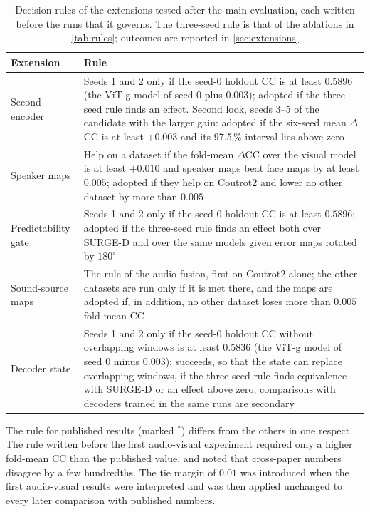 \begin{table}[htbp]
  \centering
  \caption{Decision rules of the extensions tested after the main evaluation,
  each written before the runs that it governs. The three-seed rule is that of
  the ablations in \cref{tab:rules}; outcomes are reported in
  \cref{sec:extensions}}\label{tab:rules-ext}
  \small
  \begin{tabularx}{\textwidth}{@{}>{\raggedright}p{3.3cm}>{\raggedright\arraybackslash}X@{}}
    \toprule
    \textbf{Extension} & \textbf{Rule} \\
    \midrule
    Second encoder & Seeds 1 and 2 only if the seed-0 holdout \acrshort{CC} is
      at least $0.5896$ (the \acrshort{ViT}-g model of seed 0 plus $0.003$); adopted if the
      three-seed rule finds an effect. Second look, seeds 3--5 of the candidate
      with the larger gain: adopted if the six-seed mean $\Delta$\acrshort{CC} is at least
      $+0.003$ and its 97.5\,\% interval lies above zero \\
    Speaker maps & Help on a dataset if the fold-mean $\Delta$\acrshort{CC} over the
      visual model is at least $+0.010$ and speaker maps beat face maps by at
      least $0.005$; adopted if they help on Coutrot2 and lower no other dataset
      by more than $0.005$ \\
    Predictability gate & Seeds 1 and 2 only if the seed-0 holdout \acrshort{CC}
      is at least $0.5896$; adopted if the three-seed rule finds an effect both
      over SURGE-D and over the same models given error maps rotated by
      $180^{\circ}$ \\
    Sound-source maps & The rule of the audio fusion, first on Coutrot2
      alone; the other datasets are run only if it is met there, and the maps are
      adopted if, in addition, no other dataset loses more than $0.005$ fold-mean
      \acrshort{CC} \\
    Decoder state & Seeds 1 and 2 only if the seed-0 holdout \acrshort{CC} without
      overlapping windows is at least $0.5836$ (the \acrshort{ViT}-g model of seed 0
      minus $0.003$); succeeds, so that the state can replace overlapping windows,
      if the three-seed rule finds equivalence with SURGE-D or an effect above
      zero; comparisons with decoders trained in the same runs are secondary \\
    \bottomrule
  \end{tabularx}
\end{table}

The rule for published results (marked $^{\ast}$) differs from the others in one
respect. The rule written before the first audio-visual experiment required only
a higher fold-mean \acrshort{CC} than the published value, and noted that cross-paper
numbers disagree by a few hundredths. The tie margin of $0.01$ was introduced
when the first audio-visual results were interpreted and was then applied
unchanged to every later comparison with published numbers.

